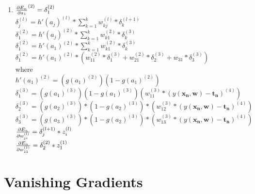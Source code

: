 \documentclass[12pt,letterpaper]{article}
\renewcommand{\vec}[1]{\mathbf{#1}}
\begin{document}
\begin{enumerate}
	\item $\pdv{E_{n}}{a_{1}}^{(2)}=\delta_{1}^{(2)}$
	\\
	$\delta_{j}^{(l)}=h'(a_{j})^{(l)}*\sum_{k=1}^{k}w_{kj}^{(l)}*\delta_{k}^{(l+1)}$
	$\delta_{1}^{(2)}=h'(a_{j})^{(2)}*\sum_{k=1}^{k}w_{k1}^{(2)}*\delta_{k}^{(3)}$
	$\delta_{1}^{(2)}=h'(a_{1})^{(2)}*\sum_{k=1}^{k}w_{k1}^{(2)}*\delta_{k}^{(3)}$
	$\delta_{1}^{(2)}=h'(a_{1})^{(2)}*(w_{11}^{(2)}*\delta_{1}^{(3)}+w_{21}^{(2)}*\delta_{2}^{(3)}+w_{31}*\delta_{3}^{(3)})$
	\\
	where
	\\
	$h'(a_{1})^{(2)}=(g(a_{1})^{(2)})(1-g(a_{1})^{(2)})$
	\\
	$\delta_{1}^{(3)}=(g(a_{1})^{(3)})(1-g(a_{1})^{(3)})(w_{11}^{(3)}*(y(\vec{x_{n}},\vec{w})-\vec{t_{n}})^{(4)})$
	\\
	$\delta_{2}^{(3)}=(g(a_{2})^{(3)})*(1-g(a_{2})^{(3)})*(w_{12}^{(3)}*(y(\vec{x_{n}},\vec{w}) - \vec{t_{n}})^{(4)})$
	\\
	$\delta_{3}^{(3)}=(g(a_{3})^{(3)})*(1-g(a_{2})^{(3)})*(w_{13}^{(3)}*(y(\vec{x_{n}},\vec{w})-\vec{t_{n}})^{(4)})$
	\\
	$\pdv{E_{n}}{w_{ji}^{(l)}}=\delta_{j}^{(l+1)}*z_{i}^{(l)}$
	\\
	$\pdv{E_{n}}{w_{11}^{(1)}}=\delta_{2}^{(2)}*z_{1}^{(1)}$
	
	
\end{enumerate}

\section{Vanishing Gradients}
\end{document}

